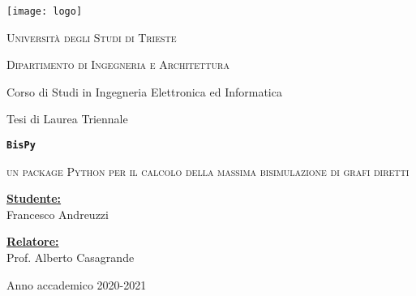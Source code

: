 \documentclass[11pt]{article}
\begin{document}
\begin{titlepage}
  \begin{center}
      \texttt{[image: logo]}

      \vspace{1cm}

      \Large
      \textsc{Università degli Studi di Trieste}
      \makebox[\textwidth][c]{\rule{\textwidth}{.4pt}}

      \textsc{Dipartimento di Ingegneria e Architettura}

      \vspace{0.5cm}
      Corso di Studi in Ingegneria Elettronica ed Informatica

      \vspace{1cm}

      Tesi di Laurea Triennale

      \vspace{1cm}

      \makebox[\textwidth][c]{\rule{\textwidth}{.4pt}}
      \Large
      \textbf{\texttt{BisPy}}

      \large
      \textsc{un package Python per il calcolo della massima bisimulazione di grafi diretti}
      \makebox[\textwidth][c]{\rule{\textwidth}{.4pt}}
      \vspace{1.5cm}

      \begin{minipage}{2in}
        \textbf{\underline{Studente:}} \\
        Francesco Andreuzzi
      \end{minipage}
      \hfill
      \begin{minipage}{2in}
        \textbf{\underline{Relatore:}} \\
        Prof. Alberto Casagrande
      \end{minipage}

      \vspace*{\fill}

      \makebox[\textwidth][c]{\rule{\textwidth}{.4pt}}

      Anno accademico 2020-2021
  \end{center}
\end{titlepage}

\blankpage

\renewcommand\contentsname{Indice}
\tableofcontents
{}


\blankpage

\clearpage

\clearpage

\clearpage
\blankpage

\clearpage

\renewcommand\refname{Bibliografia}


\end{document}
